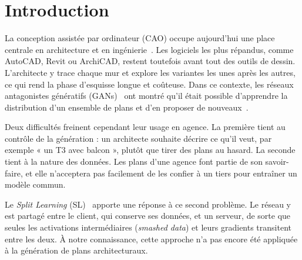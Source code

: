 \documentclass[twocolumn]{ICCKjournal}
\begin{document}


\section{Introduction}

La conception assistée par ordinateur (CAO) occupe aujourd'hui une place
centrale en architecture et en ingénierie~\cite{Gire1983}. Les logiciels
les plus répandus, comme AutoCAD, Revit ou ArchiCAD, restent toutefois
avant tout des outils de dessin. L'architecte y trace chaque mur et
explore les variantes les unes après les autres, ce qui rend la phase
d'esquisse longue et coûteuse. Dans ce contexte, les réseaux
antagonistes génératifs (GANs)~\cite{Goodfellow2020} ont montré qu'il
était possible d'apprendre la distribution d'un ensemble de plans et
d'en proposer de nouveaux~\cite{Huang2018,zheng2020apartment,
Chaillou2020ArchiGAN,Nauata2020HouseGAN}.

Deux difficultés freinent cependant leur usage en agence. La première
tient au contrôle de la génération : un architecte souhaite décrire ce
qu'il veut, par exemple « un T3 avec balcon », plutôt que tirer des plans
au hasard. La seconde tient à la nature des données. Les plans d'une
agence font partie de son savoir-faire, et elle n'acceptera pas
facilement de les confier à un tiers pour entraîner un modèle commun.

Le \emph{Split Learning} (SL)~\cite{Gupta2018Distributed,
Vepakomma2018Health} apporte une réponse à ce second problème. Le réseau
y est partagé entre le client, qui conserve ses données, et un serveur,
de sorte que seules les activations intermédiaires (\emph{smashed data})
et leurs gradients transitent entre les deux. À notre connaissance,
cette approche n'a pas encore été appliquée à la génération de plans
architecturaux.
\end{document}
